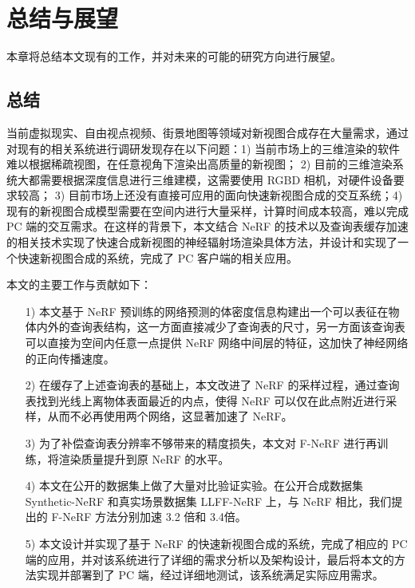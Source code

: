 \chapter{总结与展望}
本章将总结本文现有的工作，并对未来的可能的研究方向进行展望。
\section{总结}
当前虚拟现实、自由视点视频、街景地图等领域对新视图合成存在大量需求，通过对现有的相关系统进行调研发现存在以下问题：1) 当前市场上的三维渲染的软件难以根据稀疏视图，在任意视角下渲染出高质量的新视图；
2) 目前的三维渲染系统大都需要根据深度信息进行三维建模，这需要使用 RGBD 相机，对硬件设备要求较高；
3) 目前市场上还没有直接可应用的面向快速新视图合成的交互系统；4) 现有的新视图合成模型需要在空间内进行大量采样，计算时间成本较高，难以完成 PC 端的交互需求。在这样的背景下，本文结合 NeRF 的技术以及查询表缓存加速的相关技术实现了快速合成新视图的神经辐射场渲染具体方法，并设计和实现了一个快速新视图合成的系统，完成了 PC 客户端的相关应用。

本文的主要工作与贡献如下：

\begin{enumerate}
	\item [1)] 本文基于 NeRF 预训练的网络预测的体密度信息构建出一个可以表征在物体内外的查询表结构，这一方面直接减少了查询表的尺寸，另一方面该查询表可以直接为空间内任意一点提供 NeRF 网络中间层的特征，这加快了神经网络的正向传播速度。
	\item [2)] 在缓存了上述查询表的基础上，本文改进了 NeRF 的采样过程，通过查询表找到光线上离物体表面最近的内点，使得 NeRF 可以仅在此点附近进行采样，从而不必再使用两个网络，这显著加速了 NeRF。
	\item [3)] 为了补偿查询表分辨率不够带来的精度损失，本文对 F-NeRF 进行再训练，将渲染质量提升到原 NeRF 的水平。
	\item [4)] 本文在公开的数据集上做了大量对比验证实验。在公开合成数据集 Synthetic-NeRF 和真实场景数据集 LLFF-NeRF 上，与 NeRF 相比，我们提出的 F-NeRF 方法分别加速 3.2 倍和 3.4倍。 
	\item [5)] 本文设计并实现了基于 NeRF 的快速新视图合成的系统，完成了相应的 PC 端的应用，并对该系统进行了详细的需求分析以及架构设计，最后将本文的方法实现并部署到了 PC 端，经过详细地测试，该系统满足实际应用需求。
\end{enumerate}


